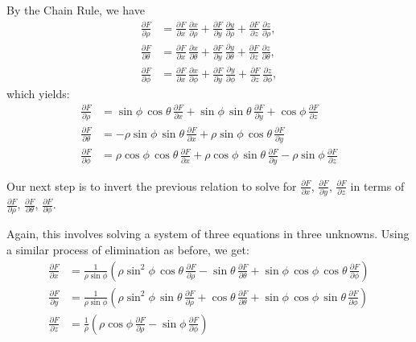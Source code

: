 {By the Chain Rule, we have
\begin{align*}
 \frac{\partial F}{\partial \rho} &= \frac{\partial F}{\partial x}\,\frac{\partial x}{\partial \rho} +
  \frac{\partial F}{\partial y}\,\frac{\partial y}{\partial \rho} +
  \frac{\partial F}{\partial z}\,\frac{\partial z}{\partial \rho} ,\\
 \frac{\partial F}{\partial \theta} &= \frac{\partial F}{\partial x}\,\frac{\partial x}{\partial \theta} +
  \frac{\partial F}{\partial y}\,\frac{\partial y}{\partial \theta} +
  \frac{\partial F}{\partial z}\,\frac{\partial z}{\partial \theta} ,\\
 \frac{\partial F}{\partial \phi} &= \frac{\partial F}{\partial x}\,\frac{\partial x}{\partial \phi} +
  \frac{\partial F}{\partial y}\,\frac{\partial y}{\partial \phi} +
  \frac{\partial F}{\partial z}\,\frac{\partial z}{\partial \phi} ,
\end{align*}
which yields:
\begin{align}
 \frac{\partial F}{\partial \rho} &= \sin\phi\,\cos\theta\,\frac{\partial F}{\partial x} +
  \sin\phi\,\sin\theta\,\frac{\partial F}{\partial y} + \cos\phi\,\frac{\partial F}{\partial z}\\
 \frac{\partial F}{\partial \theta} &= -\rho\sin\phi\,\sin\theta\,\frac{\partial F}{\partial x} +
  \rho\sin\phi\,\cos\theta\,\frac{\partial F}{\partial y}\\
 \frac{\partial F}{\partial \phi} &= \rho\cos\phi\,\cos\theta\,\frac{\partial F}{\partial x} +
  \rho\cos\phi\,\sin\theta\,\frac{\partial F}{\partial y} - \rho\sin\phi\,\frac{\partial F}{\partial z}
\end{align}

Our next step is to invert the previous relation to solve for $\frac{\partial F}{\partial x}$, $\frac{\partial F}{\partial y}$, $\frac{\partial F}{\partial z}$ in terms of $\frac{\partial F}{\partial \rho}$, $\frac{\partial F}{\partial \theta}$, $\frac{\partial F}{\partial \phi}$.

Again, this involves solving a system of three equations in three unknowns. Using a similar process of elimination as before, we get:
\begin{align}
 \frac{\partial F}{\partial x} &= \frac{1}{\rho\sin\phi}\left( \rho\sin^2\phi\,\cos\theta\,
  \frac{\partial F}{\partial \rho} - \sin\theta\,\frac{\partial F}{\partial \theta} + \sin\phi\,\cos\phi\,\cos\theta\,
  \frac{\partial F}{\partial \phi} \right)\\
 \frac{\partial F}{\partial y} &= \frac{1}{\rho\sin\phi}\left( \rho\sin^2\phi\,\sin\theta\,
  \frac{\partial F}{\partial \rho} + \cos\theta\,\frac{\partial F}{\partial \theta} + \sin\phi\,\cos\phi\,\sin\theta\,
  \frac{\partial F}{\partial \phi} \right)\\
 \frac{\partial F}{\partial z} &= \frac{1}{\rho}\left( \rho\cos\phi\,\frac{\partial F}{\partial \rho} -
  \sin\phi\,\frac{\partial F}{\partial \phi} \right)\label{partials_cart_sphere}
\end{align}

}
